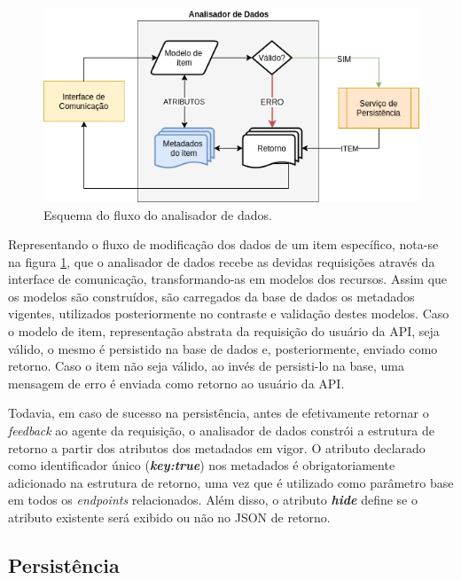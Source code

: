 \begin{figure}[h!tp]
	\caption{\label{validation_schema}Esquema do fluxo do analisador de dados.}
	\begin{center}
		\includegraphics[scale=0.8]{images/validation.png}
	\end{center}
	\hspace{5.5cm}{Fonte: O Autor.}
\end{figure}

Representando o fluxo de modificação dos dados de um item específico, nota-se na figura \ref{validation_schema}, que o analisador de dados recebe as devidas requisições através da interface de comunicação, transformando-as em modelos dos recursos. Assim que os modelos são construídos, são carregados da base de dados os metadados vigentes, utilizados posteriormente no contraste e validação destes modelos. Caso o modelo de item, representação abstrata da requisição do usuário da API, seja válido, o mesmo é persistido na base de dados e, posteriormente, enviado como retorno. Caso o item não seja válido, ao invés de persisti-lo na base, uma mensagem de erro é enviada como retorno ao usuário da API.

Todavia, em caso de sucesso na persistência, antes de efetivamente retornar o \textit{feedback} ao agente da requisição, o analisador de dados constrói a estrutura de retorno a partir dos atributos dos metadados em vigor. O atributo declarado como identificador único (\textbf{\textit{key:true}}) nos metadados é obrigatoriamente adicionado na estrutura de retorno, uma vez que é utilizado como parâmetro base em todos os \textit{endpoints} relacionados. Além disso, o atributo \textbf{\textit{hide}} define se o atributo existente será exibido ou não no JSON de retorno.

\subsection{Persistência} \label{analisador:persistencia}

